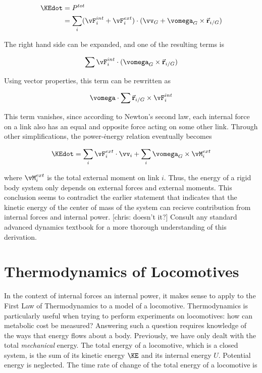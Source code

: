 \begin{align}
\KEdot &= P^{tot} \notag \\
 &= \sum_{i} (\vF_{i}^{int} + \vF_{i}^{ext} ) \cdot ( \vv_{G} + \vomega_{G} \times \vec{\mathbf{r}}_{i/G})
\end{align}

The right hand side can be expanded, and one of the resulting terms is

\begin{equation}
\sum \vF_{i}^{int} \cdot (\vomega_{G} \times \vec{\mathbf{r}}_{i/G}) \notag
\end{equation}

Using vector properties, this term can be rewritten as

\begin{equation}
\vomega \cdot \sum \vec{\mathbf{r}}_{i/G} \times \vF_{i}^{int} \notag
\end{equation}

This term vanishes, since according to Newton's second law, each internal force on a link also has an equal and opposite force acting on some other link. Through other simplifications, the power-\.{energy} relation eventually becomes

\begin{equation}
\KEdot = \sum_{i} \vF_{i}^{ext} \cdot \vv_{i} + \sum_{i} \vomega_{G} \times \vM_{i}^{ext}
\end{equation}

where $\vM_{i}^{ext}$ is the total external moment on link $i$. Thus, the energy of a rigid body system only depends on external forces and external moments. This conclusion seems to contradict the earlier statement that indicates that the kinetic energy of the center of mass of the system can recieve contribution from internal forces and internal power. [chris: doesn't it?] Consult any standard advanced dynamics textbook for a more thorough understanding of this derivation.

\section{Thermodynamics of Locomotives}
\label{sec:ThermodynamicsofLocomotives}

In the context of internal forces an internal power, it makes sense to apply to the First Law of Thermodynamics to a model of a locomotive. Thermodynamics is particularly useful when trying to perform experiments on locomotives: how can metabolic cost be measured? Answering such a question requires knowledge of the ways that energy flows about a body. Previously, we have only dealt with the total \emph{mechanical} energy. The total energy of a locomotive, which is a closed system, is the sum of its kinetic energy $\KE$ and its internal energy $U$. Potential energy is neglected. The time rate of change of the total energy of a locomotive is

